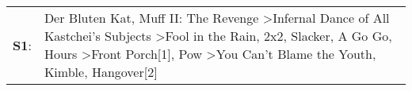 \begin{supertabular}{p{0.03\textwidth}p{0.92\textwidth}}
 \textbf{S1}:  &  Der Bluten Kat\textsuperscript{}, \enspace Muff II: The Revenge\textsuperscript{} \textgreater \enspace Infernal Dance of All Kastchei's Subjects\textsuperscript{} \textgreater \enspace Fool in the Rain\textsuperscript{}, \enspace 2x2\textsuperscript{}, \enspace Slacker\textsuperscript{}, \enspace A Go Go\textsuperscript{}, \enspace Hours\textsuperscript{} \textgreater \enspace Front Porch[1]\textsuperscript{}, \enspace Pow\textsuperscript{} \textgreater \enspace You Can't Blame the Youth\textsuperscript{}, \enspace Kimble\textsuperscript{}, \enspace Hangover[2]\textsuperscript{}  \enspace  \\
\end{supertabular}
